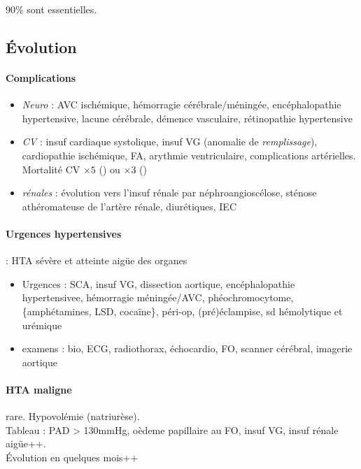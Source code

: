 90\% sont essentielles.

\subsection{Évolution}
\paragraph{Complications}
\begin{itemize}
  \item 
\textit{Neuro}  : AVC ischémique, hémorragie cérébrale/méningée, encéphalopathie
hypertensive, lacune cérébrale, démence vasculaire, rétinopathie hypertensive
\item \textit{CV}  : insuf cardiaque systolique, insuf VG (anomalie de
  \textit{remplissage}), cardiopathie ischémique, FA, arythmie
  ventriculaire, complications artérielles. Mortalité CV $\times 5$ (\male) ou
  $\times 3$ (\female)
\item \textit{rénales} : évolution vers l'insuf rénale par néphroangioscélose,
  sténose athéromateuse de l'artère rénale, diurétiques, IEC
\end{itemize}

\paragraph{Urgences hypertensives} : HTA sévère et atteinte aigüe des organes
\begin{itemize}
  \item Urgences : SCA, insuf VG, dissection aortique, encéphalopathie
    hypertensivee, hémorragie méningée/AVC, phéochromocytome, \{amphétamines, 
    LSD, cocaïne\}, péri-op, (pré)éclampise, sd hémolytique et urémique
  \item examens : bio, ECG, radiothorax, échocardio, \gls{FO},
    scanner cérébral, imagerie aortique
\end{itemize}

\paragraph{HTA maligne} rare. Hypovolémie (natriurèse). \\
Tableau : PAD > 130mmHg, oèdeme papillaire au FO, insuf VG, insuf rénale
aigüe++. \\
Évolution en quelques mois++

